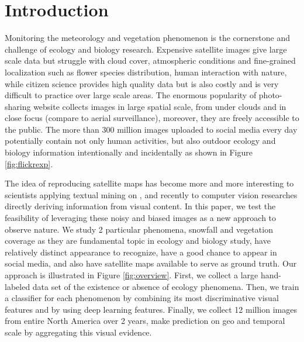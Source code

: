 \section{Introduction}

Monitoring the meteorology and vegetation phenomenon is the cornerstone and challenge of ecology and biology research. Expensive satellite images give large scale data but struggle with cloud cover, 
atmospheric conditions and fine-grained localization such as flower species distribution, human interaction with nature,
while citizen science provides high quality data but is also costly and is very difficult to practice over large scale areas.
The enormous popularity of photo-sharing website collects images in large spatial scale, from under clouds and in close focus (compare to aerial surveillance), 
moreover, they are freely accessible to the public.
The more than 300 million images uploaded to social media every day
\cite{https://zephoria.com/top-15-valuable-facebook-statistics/}
 potentially contain not only human activities, but also outdoor ecology and biology information intentionally and incidentally as shown in Figure \ref{fig:flickrexp}.

The idea of reproducing satellite maps has become more and more interesting to scientists applying textual mining on , 
and recently to computer vision researches directly deriving  information from visual content.
In this paper, we test the feasibility of leveraging these noisy and biased images as a new approach to observe nature. We study 2 particular phenomena, snowfall and vegetation coverage as they are fundamental topic in ecology and biology study, have relatively distinct appearance to recognize, have a good chance to appear in social media, and also have satellite maps available to serve as ground truth. Our approach is illustrated in Figure \ref{fig:overview}. 
First, we collect a large hand-labeled data set of the existence or absence of ecology phenomena. 
Then, we train a classifier for each phenomenon by combining its most discriminative visual features and by using deep learning features. 
Finally, we collect 12 million images from entire North America over 2 years, make prediction on geo and temporal scale by aggregating this visual evidence.

